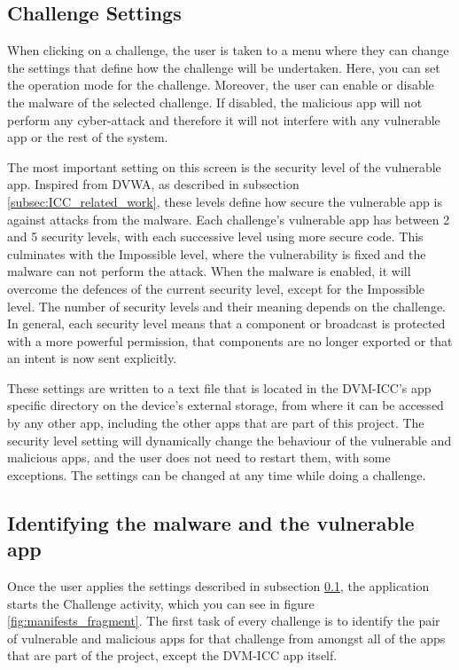     \subsection{Challenge Settings}
        \label{subsec:challenge_settings}
        
    When clicking on a challenge, the user is taken to a menu where they can change the settings that define how the challenge will be undertaken. Here, you can set the operation mode for the challenge. Moreover, the user can enable or disable the malware of the selected challenge. If disabled, the malicious app will not perform any cyber-attack and therefore it will not interfere with any vulnerable app or the rest of the system.
    
    The most important setting on this screen is the security level of the vulnerable app. Inspired from DVWA, as described in subsection \ref{subsec:ICC_related_work}, these levels define how secure the vulnerable app is against attacks from the malware. Each challenge's vulnerable app has between 2 and 5 security levels, with each successive level using more secure code. This culminates with the Impossible level, where the vulnerability is fixed and the malware can not perform the attack. When the malware is enabled, it will overcome the defences of the current security level, except for the Impossible level. The number of security levels and their meaning depends on the challenge. In general, each security level means that a component or broadcast is protected with a more powerful permission, that components are no longer exported or that an intent is now sent explicitly. 
    
    These settings are written to a text file that is located in the DVM-ICC's app specific directory on the device's external storage, from where it can be accessed by any other app, including the other apps that are part of this project. The security level setting will dynamically change the behaviour of the vulnerable and malicious apps, and the user does not need to restart them, with some exceptions. The settings can be changed at any time while doing a challenge.
    
    \subsection{Identifying the malware and the vulnerable app}
        \label{subsec:identify_challenge_apps}
        
    Once the user applies the settings described in subsection \ref{subsec:challenge_settings}, the application starts the Challenge activity, which you can see in figure \ref{fig:manifests_fragment}. The first task of every challenge is to identify the pair of vulnerable and malicious apps for that challenge from amongst all of the apps that are part of the project, except the DVM-ICC app itself. 
    
